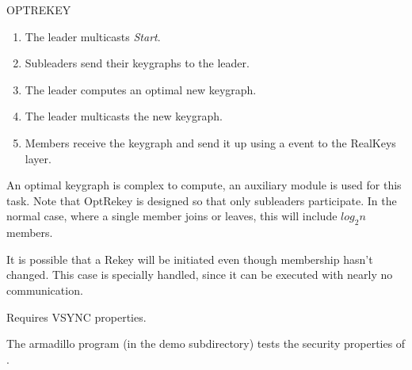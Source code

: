 \begin{Layer}{OPTREKEY}
\begin{Protocol}
\begin{enumerate}
\item The leader multicasts {\it Start}.
\item Subleaders send their keygraphs to the leader.
\item The leader computes an optimal new keygraph. 
\item The leader multicasts the new keygraph.
\item Members receive the keygraph and send it up using a 
event to the RealKeys layer.
\end{enumerate}

An optimal keygraph is complex to compute, an auxiliary module is used
for this task. Note that OptRekey is designed so that only
subleaders participate. In the normal case, where a single member
joins or leaves, this will include $log_2n$ members.

It is possible that a Rekey will be initiated even though
membership hasn't changed. This case is specially handled, since it can
be executed with nearly no communication.
\end{Protocol}

\begin{Properties}
\item Requires VSYNC properties.
\end{Properties}

\begin{Sources}
\end{Sources}

\begin{GenEvent}
\genevent{\DnCast}
\genevent{\DnSend}
\end{GenEvent}

\begin{Testing}
\item 
The armadillo program (in the demo subdirectory) tests the security properties
of \ensemble.
\end{Testing}

\end{Layer}




